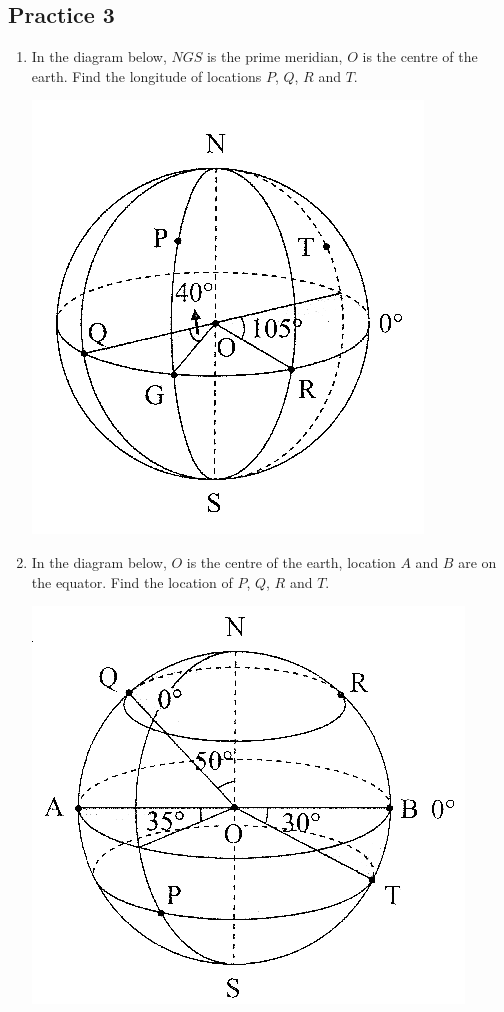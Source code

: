 \documentclass{report}
\begin{document}
\begin{multicols}{2}
    \subsection{Practice 3}

    \begin{enumerate}
        \item In the diagram below, $NGS$ is the prime meridian, $O$ is the centre of the
              earth. Find the longitude of locations $P$, $Q$, $R$ and $T$.
              \begin{center}
                  \includegraphics[scale=1.3]{p3q1.png}
              \end{center}
        \item In the diagram below, $O$ is the centre of the earth, location $A$ and $B$ are
              on the equator. Find the location of $P$, $Q$, $R$ and $T$.
              \begin{center}
                  \includegraphics[scale=1.3]{p3q2.png}
              \end{center}
    \end{enumerate}


\end{multicols}
\end{document}
